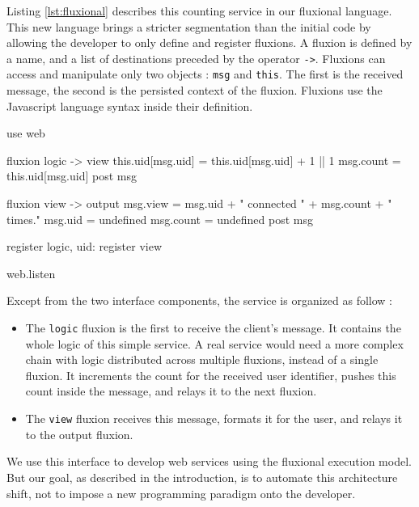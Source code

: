 Listing \ref{lst:fluxional} describes this counting service in our fluxional language.
This new language brings a stricter segmentation than the initial code by allowing the developer to only define and register fluxions.
A fluxion is defined by a name, and a list of destinations preceded by the operator \texttt{-}\texttt{>}.
Fluxions can access and manipulate only two objects : \texttt{msg} and \texttt{this}.
The first is the received message, the second is the persisted context of the fluxion.
Fluxions use the Javascript language syntax inside their definition.


\begin{code}[js, caption={Fluxional sample},label={lst:fluxional}]
use web

fluxion logic -> view
  this.uid[msg.uid] = this.uid[msg.uid] + 1 || 1
  msg.count = this.uid[msg.uid]
  post msg

fluxion view -> output
  msg.view = msg.uid + " connected " + msg.count + " times."
  msg.uid = undefined
  msg.count = undefined
  post msg

register logic, {uid: {}}
register view

web.listen
\end{code}

Except from the two interface components, the service is organized as follow :
\begin{itemize}
  \item The \texttt{logic} fluxion is the first to receive the client's message.
  It contains the whole logic of this simple service.
  A real service would need a more complex chain with logic distributed across multiple fluxions, instead of a single fluxion.
  It increments the count for the received user identifier, pushes this count inside the message, and relays it to the next fluxion.
  \item The \texttt{view} fluxion receives this message, formats it for the user, and relays it to the output fluxion.
\end{itemize}

We use this interface to develop web services using the fluxional execution model.
But our goal, as described in the introduction, is to automate this architecture shift, not to impose a new programming paradigm onto the developer.


